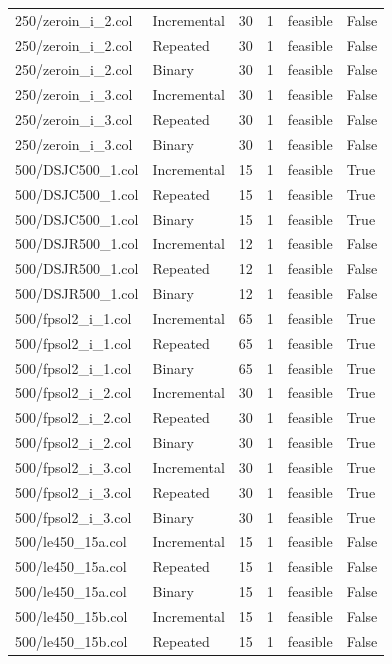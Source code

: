 \begin{table}[htbp]
\begin{tabular}{llllll}
250/zeroin\_i\_2.col & Incremental & 30 & 1 & feasible & False \\
250/zeroin\_i\_2.col & Repeated & 30 & 1 & feasible & False \\
250/zeroin\_i\_2.col & Binary & 30 & 1 & feasible & False \\
250/zeroin\_i\_3.col & Incremental & 30 & 1 & feasible & False \\
250/zeroin\_i\_3.col & Repeated & 30 & 1 & feasible & False \\
250/zeroin\_i\_3.col & Binary & 30 & 1 & feasible & False \\
500/DSJC500\_1.col & Incremental & 15 & 1 & feasible & True \\
500/DSJC500\_1.col & Repeated & 15 & 1 & feasible & True \\
500/DSJC500\_1.col & Binary & 15 & 1 & feasible & True \\
500/DSJR500\_1.col & Incremental & 12 & 1 & feasible & False \\
500/DSJR500\_1.col & Repeated & 12 & 1 & feasible & False \\
500/DSJR500\_1.col & Binary & 12 & 1 & feasible & False \\
500/fpsol2\_i\_1.col & Incremental & 65 & 1 & feasible & True \\
500/fpsol2\_i\_1.col & Repeated & 65 & 1 & feasible & True \\
500/fpsol2\_i\_1.col & Binary & 65 & 1 & feasible & True \\
500/fpsol2\_i\_2.col & Incremental & 30 & 1 & feasible & True \\
500/fpsol2\_i\_2.col & Repeated & 30 & 1 & feasible & True \\
500/fpsol2\_i\_2.col & Binary & 30 & 1 & feasible & True \\
500/fpsol2\_i\_3.col & Incremental & 30 & 1 & feasible & True \\
500/fpsol2\_i\_3.col & Repeated & 30 & 1 & feasible & True \\
500/fpsol2\_i\_3.col & Binary & 30 & 1 & feasible & True \\
500/le450\_15a.col & Incremental & 15 & 1 & feasible & False \\
500/le450\_15a.col & Repeated & 15 & 1 & feasible & False \\
500/le450\_15a.col & Binary & 15 & 1 & feasible & False \\
500/le450\_15b.col & Incremental & 15 & 1 & feasible & False \\
500/le450\_15b.col & Repeated & 15 & 1 & feasible & False \\

\end{tabular}
\end{table}

